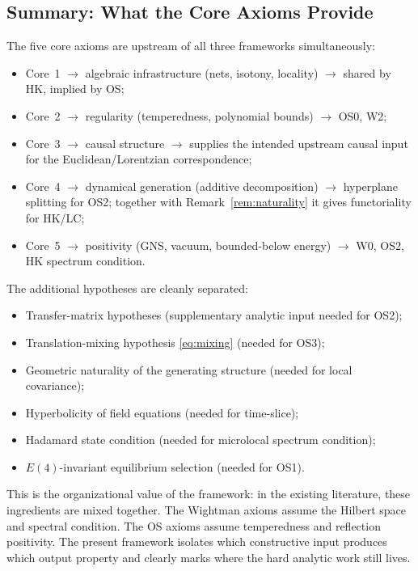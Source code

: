\documentclass[12pt,a4paper]{article}
\theoremstyle{plain}
\theoremstyle{definition}
\theoremstyle{remark}
\begin{document}
\subsection{Summary: What the Core Axioms Provide}

The five core axioms are upstream of all three frameworks
simultaneously:

\begin{itemize}[nosep]
\item Core~1 $\to$ algebraic infrastructure (nets, isotony, locality)
  $\to$ shared by HK, implied by OS;
\item Core~2 $\to$ regularity (temperedness, polynomial bounds) $\to$
  OS0, W2;
\item Core~3 $\to$ causal structure $\to$ supplies the intended
  upstream causal input for the Euclidean/Lorentzian correspondence;
\item Core~4 $\to$ dynamical generation (additive decomposition) $\to$
  hyperplane splitting for OS2; together with
  Remark~\ref{rem:naturality} it gives functoriality for HK/LC;
\item Core~5 $\to$ positivity (GNS, vacuum, bounded-below energy)
  $\to$ W0, OS2, HK spectrum condition.
\end{itemize}

The additional hypotheses are cleanly separated:

\begin{itemize}[nosep]
\item Transfer-matrix hypotheses (supplementary analytic input needed
  for OS2);
\item Translation-mixing hypothesis \eqref{eq:mixing} (needed for
  OS3);
\item Geometric naturality of the generating structure (needed for
  local covariance);
\item Hyperbolicity of field equations (needed for time-slice);
\item Hadamard state condition (needed for microlocal spectrum
  condition);
\item $E(4)$-invariant equilibrium selection (needed for OS1).
\end{itemize}

This is the organizational value of the framework: in the existing
literature, these ingredients are mixed together. The Wightman axioms
assume the Hilbert space and spectral condition. The OS axioms assume
temperedness and reflection positivity. The present framework isolates
which constructive input produces which output property and clearly
marks where the hard analytic work still lives.
\end{document}
